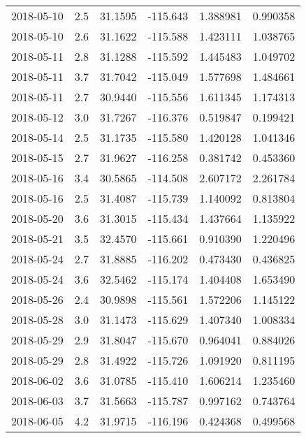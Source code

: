 \begin{tabular}{lrrrrr}
2018-05-10 &       2.5 &  31.1595 &  -115.643 &         1.388981 &         0.990358 \\
2018-05-10 &       2.6 &  31.1622 &  -115.588 &         1.423111 &         1.038765 \\
2018-05-11 &       2.8 &  31.1288 &  -115.592 &         1.445483 &         1.049702 \\
2018-05-11 &       3.7 &  31.7042 &  -115.049 &         1.577698 &         1.484661 \\
2018-05-11 &       2.7 &  30.9440 &  -115.556 &         1.611345 &         1.174313 \\
2018-05-12 &       3.0 &  31.7267 &  -116.376 &         0.519847 &         0.199421 \\
2018-05-14 &       2.5 &  31.1735 &  -115.580 &         1.420128 &         1.041346 \\
2018-05-15 &       2.7 &  31.9627 &  -116.258 &         0.381742 &         0.453360 \\
2018-05-16 &       3.4 &  30.5865 &  -114.508 &         2.607172 &         2.261784 \\
2018-05-16 &       2.5 &  31.4087 &  -115.739 &         1.140092 &         0.813804 \\
2018-05-20 &       3.6 &  31.3015 &  -115.434 &         1.437664 &         1.135922 \\
2018-05-21 &       3.5 &  32.4570 &  -115.661 &         0.910390 &         1.220496 \\
2018-05-24 &       2.7 &  31.8885 &  -116.202 &         0.473430 &         0.436825 \\
2018-05-24 &       3.6 &  32.5462 &  -115.174 &         1.404408 &         1.653490 \\
2018-05-26 &       2.4 &  30.9898 &  -115.561 &         1.572206 &         1.145122 \\
2018-05-28 &       3.0 &  31.1473 &  -115.629 &         1.407340 &         1.008334 \\
2018-05-29 &       2.9 &  31.8047 &  -115.670 &         0.964041 &         0.884026 \\
2018-05-29 &       2.8 &  31.4922 &  -115.726 &         1.091920 &         0.811195 \\
2018-06-02 &       3.6 &  31.0785 &  -115.410 &         1.606214 &         1.235460 \\
2018-06-03 &       3.7 &  31.5663 &  -115.787 &         0.997162 &         0.743764 \\
2018-06-05 &       4.2 &  31.9715 &  -116.196 &         0.424368 &         0.499568 \\

\end{tabular}
